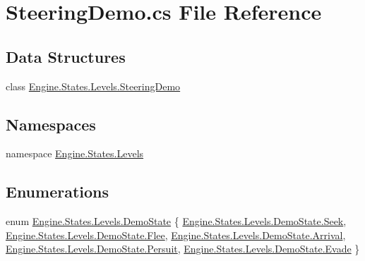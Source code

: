 \hypertarget{a00209}{}\section{Steering\+Demo.\+cs File Reference}
\label{a00209}
\subsection*{Data Structures}
\begin{DoxyCompactItemize}
\item 
class \hyperlink{a00570}{Engine.\+States.\+Levels.\+Steering\+Demo}
\end{DoxyCompactItemize}
\subsection*{Namespaces}
\begin{DoxyCompactItemize}
\item 
namespace \hyperlink{a00279}{Engine.\+States.\+Levels}
\end{DoxyCompactItemize}
\subsection*{Enumerations}
\begin{DoxyCompactItemize}
\item 
enum \hyperlink{a00279_a6ec33a1c7bddde5743b33ce8f3d41fcc}{Engine.\+States.\+Levels.\+Demo\+State} \{ \newline
\hyperlink{a00279_a6ec33a1c7bddde5743b33ce8f3d41fccaed7ecb1dbb9be8c65f909819dac7aa54}{Engine.\+States.\+Levels.\+Demo\+State.\+Seek}, 
\hyperlink{a00279_a6ec33a1c7bddde5743b33ce8f3d41fcca20a8b1e6e473f9f1b219973fb365af44}{Engine.\+States.\+Levels.\+Demo\+State.\+Flee}, 
\hyperlink{a00279_a6ec33a1c7bddde5743b33ce8f3d41fcca885b3c534ec909cf87987897bfba2235}{Engine.\+States.\+Levels.\+Demo\+State.\+Arrival}, 
\hyperlink{a00279_a6ec33a1c7bddde5743b33ce8f3d41fcca09a6ef77969b3d19389bf96746c485d9}{Engine.\+States.\+Levels.\+Demo\+State.\+Persuit}, 
\newline
\hyperlink{a00279_a6ec33a1c7bddde5743b33ce8f3d41fccafcebb8bec493a6678a2758580bee43f9}{Engine.\+States.\+Levels.\+Demo\+State.\+Evade}
 \}
\end{DoxyCompactItemize}
